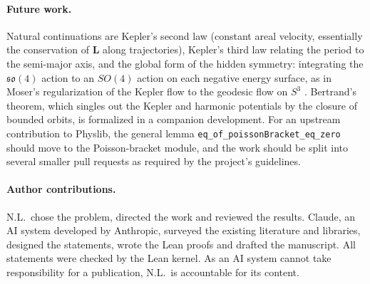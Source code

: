 \documentclass[11pt]{article}
\theoremstyle{definition}
\theoremstyle{remark}
\newcommand{\vL}{\mathbf{L}}
\begin{document}
\paragraph{Future work.} Natural continuations are Kepler's second law (constant areal velocity,
essentially the conservation of $\vL$ along trajectories), Kepler's third law relating the period
to the semi-major axis, and the global form of the hidden symmetry: integrating the
$\mathfrak{so}(4)$ action to an $SO(4)$ action on each negative energy surface, as in Moser's
regularization of the Kepler flow to the geodesic flow on $S^3$ \cite{moser1970}. Bertrand's
theorem, which singles out the Kepler and harmonic potentials by the closure of bounded orbits,
is formalized in a companion development. For an upstream contribution to Physlib, the general lemma
\texttt{eq\_of\_poissonBracket\_eq\_zero} should move to the Poisson-bracket module, and the work
should be split into several smaller pull requests as required by the project's guidelines.

\paragraph{Author contributions.} N.L.\ chose the problem, directed the work and reviewed the
results. Claude, an AI system developed by Anthropic, surveyed the existing literature and
libraries, designed the statements, wrote the Lean proofs and drafted the manuscript. All
statements were checked by the Lean kernel. As an AI system cannot take responsibility for a
publication, N.L.\ is accountable for its content.



\end{document}
